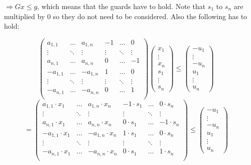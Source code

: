 	$\Rightarrow Gx\le g$, which means that the guards have to hold. Note that $s_1$ to $s_n$ are multiplied by 0 so they do not need to be considered. Also the following has to hold: \newline
\begin{figure}[H]
	\centering
	$\qquad\begin{pmatrix}
	a_{1,1}  & \dots 	& a_{1,n}	& -1 	 & \dots  & 0 \\
	\vdots   & \ddots 	& \vdots	& \vdots & \ddots & \vdots \\
	a_{n,1}  & \dots 	& a_{n,n}	& 0 	 & \dots  & -1 \\
	-a_{1,1} & \dots 	& -a_{1,n}	& 1 	 & \dots  & 0 \\
	\vdots   & \ddots 	& \vdots	& \vdots & \ddots & \vdots \\
	-a_{n,1} & \dots 	& -a_{n,n}	& 0 	 & \dots  & 1 \\
	\end{pmatrix} \begin{pmatrix} x_1 \\ \vdots \\ x_n \\ s_1 \\ \vdots \\ s_n\end{pmatrix} \le \begin{pmatrix} -u_1 \\ \vdots\\ -u_n \\ u_1 \\ \vdots \\ u_n \end{pmatrix}$ \newline
	$= \begin{pmatrix}
	a_{1,1}\cdot x_1  & \dots 	& a_{1,n}\cdot x_n	& -1\cdot s_1 & \dots  & 0\cdot s_n \\
	\vdots   	 & \ddots 	& \vdots		& \vdots & \ddots & \vdots \\
	a_{n,1}\cdot x_1  & \dots 	& a_{n,n}\cdot x_n	& 0\cdot s_1	 & \dots  & -1\cdot s_n \\
	-a_{1,1}\cdot x_1 & \dots 	& -a_{1,n}\cdot x_n	& 1\cdot s_1	 & \dots  & 0\cdot s_n \\
	\vdots   	 & \ddots 	& \vdots		& \vdots & \ddots & \vdots \\
	-a_{n,1}\cdot x_1 & \dots 	& -a_{n,n}\cdot x_n	& 0\cdot s_1	 & \dots  & 1\cdot s_n \\
	\end{pmatrix} \le \begin{pmatrix} -u_1 \\ \vdots\\ -u_n \\ u_1 \\ \vdots \\ u_n \end{pmatrix}$\\
\end{figure}
